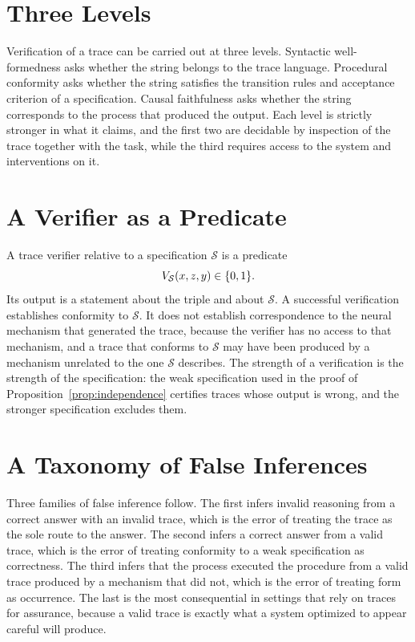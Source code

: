 \section{Three Levels}

Verification of a trace can be carried out at three levels. Syntactic well-formedness asks whether the string belongs to the trace language. Procedural conformity asks whether the string satisfies the transition rules and acceptance criterion of a specification. Causal faithfulness asks whether the string corresponds to the process that produced the output. Each level is strictly stronger in what it claims, and the first two are decidable by inspection of the trace together with the task, while the third requires access to the system and interventions on it.

\section{A Verifier as a Predicate}

A trace verifier relative to a specification $\mathcal S$ is a predicate
\[
V_{\mathcal S}(x,z,y)\in\{0,1\}.
\]
Its output is a statement about the triple and about $\mathcal S$. A successful verification establishes conformity to $\mathcal S$. It does not establish correspondence to the neural mechanism that generated the trace, because the verifier has no access to that mechanism, and a trace that conforms to $\mathcal S$ may have been produced by a mechanism unrelated to the one $\mathcal S$ describes. The strength of a verification is the strength of the specification: the weak specification used in the proof of Proposition~\ref{prop:independence} certifies traces whose output is wrong, and the stronger specification excludes them.

\section{A Taxonomy of False Inferences}

Three families of false inference follow. The first infers invalid reasoning from a correct answer with an invalid trace, which is the error of treating the trace as the sole route to the answer. The second infers a correct answer from a valid trace, which is the error of treating conformity to a weak specification as correctness. The third infers that the process executed the procedure from a valid trace produced by a mechanism that did not, which is the error of treating form as occurrence. The last is the most consequential in settings that rely on traces for assurance, because a valid trace is exactly what a system optimized to appear careful will produce.

